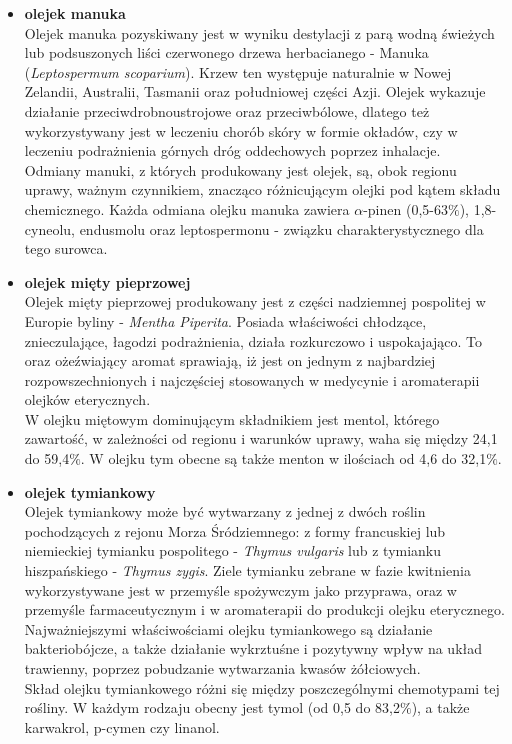 \documentclass[11pt,a4paper]{report}
\begin{document}
\begin{itemize}
\item \textbf{olejek manuka}\\
Olejek manuka pozyskiwany jest w wyniku destylacji z parą wodną świeżych lub podsuszonych liści czerwonego drzewa herbacianego - Manuka (\textit{Leptospermum scoparium}). Krzew ten występuje naturalnie w Nowej Zelandii, Australii, Tasmanii oraz południowej części Azji. Olejek wykazuje działanie przeciwdrobnoustrojowe oraz przeciwbólowe, dlatego też wykorzystywany jest w leczeniu chorób skóry w formie okładów, czy w leczeniu podrażnienia górnych dróg oddechowych poprzez inhalacje\cite{lis, pollena_ma}.\\
Odmiany manuki, z których produkowany jest olejek, są, obok regionu uprawy,  ważnym czynnikiem, znacząco różnicującym olejki pod kątem składu chemicznego. 
Każda odmiana olejku manuka zawiera $\alpha$-pinen (0,5-63$\%$), 1,8-cyneolu, endusmolu oraz leptospermonu - związku charakterystycznego dla tego surowca\cite{manukaikanuka, lis}.


\item \textbf{olejek mięty pieprzowej}\\
Olejek mięty pieprzowej produkowany jest z części nadziemnej pospolitej w Europie byliny - \textit{Mentha Piperita}\cite{pollena_mi}. Posiada właściwości chłodzące, znieczulające, łagodzi podrażnienia, działa rozkurczowo i uspokajająco. To oraz ożeźwiający aromat sprawiają, iż jest on jednym z najbardziej rozpowszechnionych i najczęściej stosowanych w medycynie i aromaterapii olejków eterycznych\cite{pollena, gorailis}.\\
W olejku miętowym dominującym składnikiem jest mentol, którego zawartość, w zależności od regionu i warunków uprawy, waha się między 24,1 do 59,4$\%$. W olejku tym obecne są także menton w ilościach od 4,6 do 32,1$\%$\cite{Law}.


\item \textbf{olejek tymiankowy}\\
Olejek tymiankowy może być wytwarzany z jednej z dwóch roślin pochodzących z rejonu Morza Śródziemnego: z formy francuskiej lub niemieckiej tymianku pospolitego - \textit{Thymus vulgaris} lub z tymianku hiszpańskiego - \textit{Thymus zygis}. Ziele tymianku zebrane w fazie kwitnienia wykorzystywane jest w przemyśle spożywczym jako przyprawa, oraz w przemyśle farmaceutycznym i w aromaterapii do produkcji olejku eterycznego. Najważniejszymi właściwościami olejku tymiankowego są działanie bakteriobójcze, a także działanie wykrztuśne i pozytywny wpływ na układ trawienny, poprzez pobudzanie wytwarzania kwasów żółciowych\cite{lis}.\\
Skład olejku tymiankowego różni się między poszczególnymi chemotypami tej rośliny. W każdym rodzaju obecny jest tymol (od 0,5 do 83,2$\%$), a także karwakrol, p-cymen czy linanol\cite{Lawr, lis}.


\end{itemize}
\end{document}
